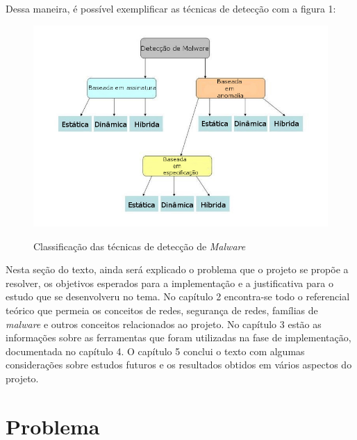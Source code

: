 Dessa maneira, é possível exemplificar as técnicas de detecção com a figura 1:

\begin{figure}[H]
\caption{\small Classificação das técnicas de detecção de \textit{Malware}}
\centering
\includegraphics[scale=0.8]{figs/fig1}
\label{f.metodos_deteccao_01}
\end{figure}

Nesta seção do texto, ainda será explicado o problema que o projeto se propõe a resolver, os objetivos esperados para a implementação e a justificativa para o estudo que se desenvolveru no tema. No capítulo 2
encontra-se todo o referencial teórico que permeia os conceitos de redes, segurança de redes, famílias de
\textit{malware} e outros conceitos relacionados ao projeto. No capítulo 3 estão as informações sobre as ferramentas que foram utilizadas na fase de implementação, documentada no capítulo 4. O capítulo 5 conclui o texto com algumas considerações sobre estudos futuros e os resultados obtidos em vários aspectos do projeto.

\section{Problema}
\label{c.problema}

